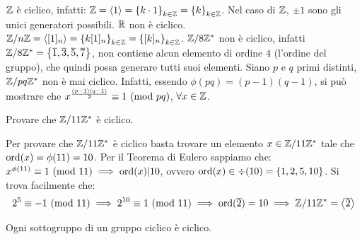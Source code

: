 \documentclass[11pt]{scrartcl}
\begin{document}
\begin{example}
	\listhack
	\begin{itemize}
	\ii $\mathbb Z$ è ciclico, infatti: $\mathbb Z=\left<1\right>=\left\{k \cdot 1\right\}_{k \in \mathbb Z}=\left\{k\right\}_{k \in \mathbb Z}$. Nel caso di $\mathbb Z$, $\pm 1$ sono gli unici generatori possibili.
	\ii $\mathbb R$ non è ciclico.
	\ii ${\mathbb Z}/n{\mathbb Z}=\left<[1]_{n}\right>=\left\{k[1]_n\right\}_{k \in \mathbb Z}=\left\{[k]_n\right\}_{k \in \mathbb Z}$.
	\ii $\mathbb Z/8\mathbb Z^*$ non è ciclico, infatti $\mathbb Z/8\mathbb Z^*=\left\{\overline{1}, \overline{3}, \overline{5}, \overline{7}\right\}$, non contiene alcun elemento di ordine $4$ (l'ordine del gruppo), che quindi possa generare tutti suoi elementi.
	\ii Siano $p$ e $q$ primi distinti, $\mathbb Z/pq\mathbb Z^*$ non è mai ciclico. Infatti, essendo $\phi(pq)=(p-1)(q-1)$, si può mostrare che $x^{\frac{(p-1)(q-1)}{2}} \equiv 1 \ (\mathrm{mod}\ pq)$, $\forall x \in \mathbb Z$.
	\end{itemize}
\end{example}

\begin{exercise}
Provare che $\mathbb Z/11\mathbb Z^*$ è ciclico.
\end{exercise}

\begin{soln}
Per provare che $\mathbb Z/11\mathbb Z^*$ è ciclico basta trovare un elemento $x \in \mathbb Z/11\mathbb Z^*$ tale che $\operatorname{ord}(x)=\phi(11)=10$. Per il Teorema di Eulero sappiamo che: $x^{\phi(11)} \equiv 1 \ (\mathrm{mod}\ 11) \implies \operatorname{ord}(x)|10$, ovvero $\operatorname{ord}(x) \in \div(10)=\left\{1, 2, 5, 10\right\}$. Si trova facilmente che:
	\[ 2^5 \equiv -1 \ (\mathrm{mod}\ 11)
	\implies
	2^{10} \equiv 1 \ (\mathrm{mod}\ 11)
	\implies
	\operatorname{ord}(\overline{2})=10
	\implies
	\mathbb Z/11\mathbb Z^*=\left<\overline{2}\right>
	\]
\end{soln}

\begin{theorem}
\label{g:sgrc}
Ogni sottogruppo di un gruppo ciclico è ciclico.
\end{theorem}
\end{document}

